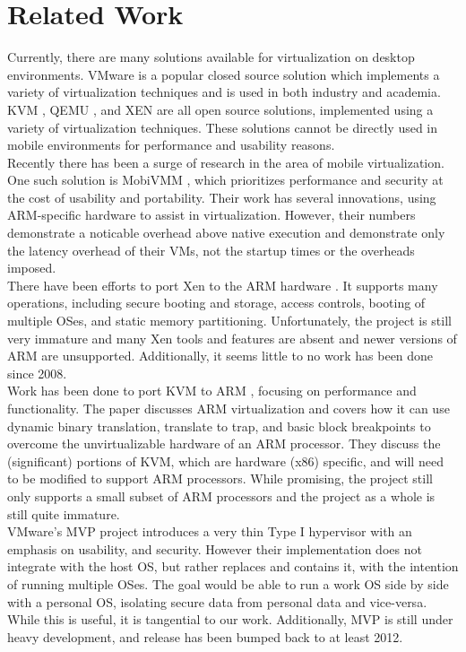 \section{Related Work}
\label{sec:related}
Currently, there are many solutions available for virtualization on desktop environments.  VMware is a popular closed source solution which implements a variety of virtualization techniques and is used in both industry and academia.  KVM \cite{kvm}, QEMU \cite{qemu}, and XEN \cite{xen} are all open source solutions, implemented using a variety of virtualization techniques.  These solutions cannot be directly used in mobile environments for performance and usability reasons. \\

Recently there has been a surge of research in the area of mobile virtualization.  One such solution is MobiVMM \cite{mobivmm}, which prioritizes performance and security at the cost of usability and portability.  Their work has several innovations, using ARM-specific hardware to assist in virtualization.  However, their numbers demonstrate a noticable overhead above native execution and demonstrate only the latency overhead of their VMs, not the startup times or the overheads imposed.\\

There have been efforts to port Xen to the ARM hardware \cite{xen}.  It supports many operations, including secure booting and storage, access controls, booting of multiple OSes, and static memory partitioning.  Unfortunately, the project is still very immature and many Xen tools and features are absent and newer versions of ARM are unsupported.  Additionally, it seems little to no work has been done since 2008. \\

Work has been done to port KVM to ARM \cite{columbia}, focusing on performance and functionality.  The paper discusses ARM virtualization and covers how it can use dynamic binary translation, translate to trap, and basic block breakpoints to overcome the unvirtualizable hardware of an ARM processor.  They discuss the (significant) portions of KVM, which are hardware (x86) specific, and will need to be modified to support ARM processors.  While promising, the project still only supports a small subset of ARM processors and the project as a whole is still quite immature.  \\
 
VMware's MVP project \cite{mvp} introduces a very thin Type I hypervisor with an emphasis on usability, and security.  However their implementation does not integrate with the host OS, but rather replaces and contains it, with the intention of running multiple OSes.  The goal would be able to run a work OS side by side with a personal OS, isolating secure data from personal data and vice-versa.  While this is useful, it is tangential to our work.  Additionally, MVP is still under heavy development, and release has been bumped back to at least 2012.  \\

